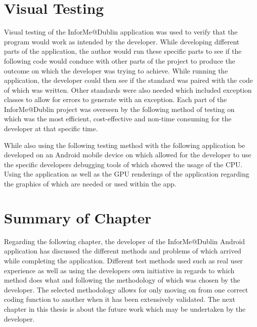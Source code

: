 \section{Visual Testing}
Visual testing of the InforMe@Dublin application was used to verify that the program would work as intended by the developer. While developing different parts of the application, the author would run these specific parts to see if the following code would conduce with other parts of the project to produce the outcome on which the developer was trying to achieve. While running the application, the developer could then see if the standard was paired with the code of which was written. Other standards were also needed which included exception classes to allow for errors to generate with an exception. Each part of the InforMe@Dublin project was overseen by the following method of testing on which was the most efficient, cost-effective and non-time consuming for the developer at that specific time.
\par
While also using the following testing method with the following application be developed on an Android mobile device on which allowed for the developer to use the specific developers debugging tools of which showed the usage of the CPU. Using the application as well as the GPU renderings of the application regarding the graphics of which are needed or used within the app.
\section{Summary of Chapter}
Regarding the following chapter, the developer of the InforMe@Dublin Android application has discussed the different methods and problems of which arrived while completing the application. Different test methods used such as real user experience as well as using the developers own initiative in regards to which method does what and following the methodology of which was chosen by the developer. The selected methodology allows for only moving on from one correct coding function to another when it has been extensively validated. The next chapter in this thesis is about the future work which may be undertaken by the developer.

